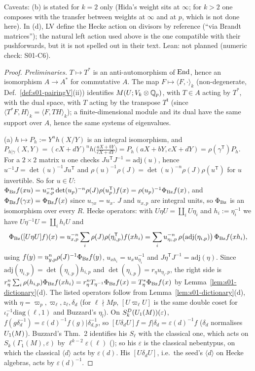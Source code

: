 Caveats: (b) is stated for $k=2$ only (Hida's weight sits at $\infty$; for $k>2$ one composes with the transfer between weights at $\infty$ and
at $p$, which is not done here). In (d), LV define the Hecke action on divisors by reference (``via Brandt matrices''); the natural left action
used above is the one compatible with their pushforwards, but it is not spelled out in their text. Lean: not planned (numeric check: S01-C6).
\begin{proof}
\emph{Preliminaries.} $T\mapsto T^*$ is an anti-automorphism of $\operatorname{End}$, hence an isomorphism $A\to A^*$ for commutative $A$.
The map $F\mapsto\langle F,\cdot\rangle_k$ (non-degenerate, Def.~\ref{def:s01-pairingV}(ii)) identifies $M(U;V_k\otimes\mathbb{Q}_p)$, with
$T\in A$ acting by $T^*$, with the dual space, with $T$ acting by the transpose $T^{\mathsf t}$ (since $\langle T^*F,H\rangle_k=\langle F,TH\rangle_k$); a
finite-dimensional module and its dual have the same support over $A$, hence the same systems of eigenvalues.

(a) $h\mapsto P_h:=Y^nh(X/Y)$ is an integral isomorphism, and $P_{h|\gamma}(X,Y)=(cX+dY)^nh\big(\tfrac{aX+bY}{cX+dY}\big)=P_h(aX+bY,cX+dY)=\rho(\gamma^{\mathsf T})P_h$.
For a $2\times2$ matrix $u$ one checks $J u^{\mathsf T}J^{-1}=\mathrm{adj}(u)$, hence $u^{-1}J=\det(u)^{-1}Ju^{\mathsf T}$ and
$\rho(u)^{-1}\rho(J)=\det(u)^{-n}\rho(J)\rho(u^{\mathsf T})$ for $u$ invertible. So for $u\in U$:
$\Phi_{\rm Bz}f(xu)=u_{x,p}^{-n}\det(u_p)^{-n}\rho(J)\rho(u_p^{\mathsf T})f(x)=\rho(u_p)^{-1}\Phi_{\rm Bz}f(x)$, and $\Phi_{\rm Bz}f(\gamma x)=\Phi_{\rm Bz}f(x)$ since
$u_{\gamma x}=u_x$. $J$ and $u_{x,p}$ are integral units, so $\Phi_{\rm Bz}$ is an isomorphism over every $R$. Hecke operators: with
$U\eta U=\coprod_iU\eta_i$ and $h_i:=\eta_i^{-1}$ we have $U\eta^{-1}U=\coprod_ih_iU$ and
\[\Phi_{\rm Bz}([U\eta U]f)(x)=u_{x,p}^{-n}\sum_i\rho(J)\rho(\eta_{i,p}^{\mathsf T})f(xh_i)=\sum_iu_{\eta_i,p}^{-n}\,\rho\big(\mathrm{adj}(\eta_{i,p})\big)\,\Phi_{\rm Bz}f(xh_i),\]
using $f(y)=u_{y,p}^n\rho(J)^{-1}\Phi_{\rm Bz}f(y)$, $u_{xh_i}=u_xu_{\eta_i}^{-1}$ and $J\eta^{\mathsf T}J^{-1}=\mathrm{adj}(\eta)$. Since $\mathrm{adj}(\eta_{i,p})=\det(\eta_{i,p})h_{i,p}$
and $\det(\eta_{i,p})=r_\eta u_{\eta_i,p}$, the right side is $r_\eta^n\sum_i\rho(h_{i,p})\Phi_{\rm Bz}f(xh_i)=r_\eta^nT_{\eta^{-1}}\Phi_{\rm Bz}f(x)=T_\eta^*\Phi_{\rm Bz}f(x)$
by Lemma~\ref{lem:s01-dictionary}(d). The listed operators follow from Lemma~\ref{lem:s01-dictionary}(d), with $\eta=\varpi_p,\varpi_\ell,z_\ell,\delta_d$
(for $\ell\nmid Mp$, $[U\varpi_\ell U]$ is the same double coset for $\iota_\ell^{-1}\mathrm{diag}(\ell,1)$ and Buzzard's $\eta_l$). On
$S^D_k(U_1(M))(\varepsilon)$, $f(g\delta_d^{-1})=\varepsilon(d)^{-1}f(g)|\delta_{d,p}^{-1}$, so $[U\delta_dU]f=f|\delta_d=\varepsilon(d)^{-1}f$ ($\delta_d$ normalises
$U_1(M)$). Buzzard's Thm.~2 identifies his $S_\ell$ with the classical one, which acts on $S_k(\Gamma_1(M),\varepsilon)$ by $\ell^{k-2}\varepsilon(\ell)$
(\stknown); so his $\varepsilon$ is the classical nebentypus, on which the classical $\langle d\rangle$ acts by $\varepsilon(d)$. His
$[U\delta_dU]$, i.e.\ the seed's $\langle d\rangle$ on Hecke algebras, acts by $\varepsilon(d)^{-1}$.


\end{proof}
